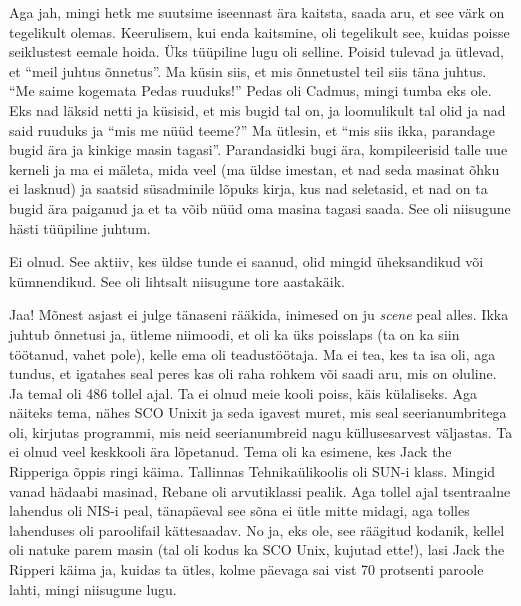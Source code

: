 Aga jah, mingi hetk me suutsime iseennast ära kaitsta, saada aru, et see värk 
on tegelikult olemas. Keerulisem, kui enda kaitsmine, oli tegelikult see, 
kuidas poisse seiklustest eemale hoida. Üks tüüpiline lugu oli selline. Poisid 
tulevad ja ütlevad, et \enquote{meil juhtus õnnetus}. Ma küsin siis, et mis 
õnnetustel teil siis täna juhtus. \enquote{Me saime kogemata Pedas ruuduks!} 
Pedas oli Cadmus, mingi 
tumba  eks ole. Eks nad läksid netti ja küsisid, et mis bugid tal on, ja 
loomulikult tal olid ja  nad said ruuduks ja \enquote{mis me nüüd teeme?} Ma 
ütlesin, et \enquote{mis siis ikka, parandage bugid ära ja kinkige masin 
tagasi}. Parandasidki bugi ära, kompileerisid talle uue kerneli ja ma ei 
mäleta, mida veel (ma üldse imestan, et nad seda masinat õhku ei lasknud) ja 
saatsid süsadminile lõpuks kirja, kus nad seletasid, et nad on ta bugid ära 
paiganud ja et ta võib nüüd oma masina tagasi saada. See oli niisugune hästi 
tüüpiline juhtum.


Ei olnud. See aktiiv, kes üldse tunde ei saanud, olid mingid üheksandikud või 
kümnendikud. See oli lihtsalt niisugune tore aastakäik. 


Jaa! Mõnest asjast ei julge tänaseni rääkida, inimesed on ju \emph{scene} peal 
alles. Ikka juhtub õnnetusi ja, ütleme niimoodi, et oli ka üks poisslaps (ta on 
ka siin 
töötanud, vahet pole), kelle ema oli teadustöötaja.  Ma ei tea, kes ta isa oli, 
aga tundus, et igatahes seal peres kas oli raha rohkem või saadi aru, mis on 
oluline.  Ja temal oli 486 tollel ajal. Ta ei olnud meie kooli poiss,  käis 
külaliseks. Aga näiteks tema, nähes SCO Unixit ja seda igavest 
muret, mis seal seerianumbritega oli, kirjutas programmi, mis neid 
seerianumbreid nagu küllusesarvest väljastas. Ta ei olnud veel keskkooli ära 
lõpetanud. Tema oli ka esimene,  kes Jack the Ripperiga õppis ringi käima. 
Tallinnas Tehnikaülikoolis oli SUN-i klass. 
Mingid vanad hädaabi masinad, Rebane oli arvutiklassi pealik. Aga tollel ajal 
tsentraalne lahendus oli NIS-i peal, tänapäeval see sõna ei ütle mitte midagi, 
aga tolles lahenduses oli paroolifail kättesaadav. No ja, eks ole, see räägitud 
kodanik, kellel oli natuke parem masin (tal oli kodus ka SCO 
Unix, kujutad ette!), lasi Jack the Ripperi käima ja, kuidas ta 
ütles,  kolme päevaga sai vist 70 protsenti paroole lahti, mingi niisugune 
lugu. 

